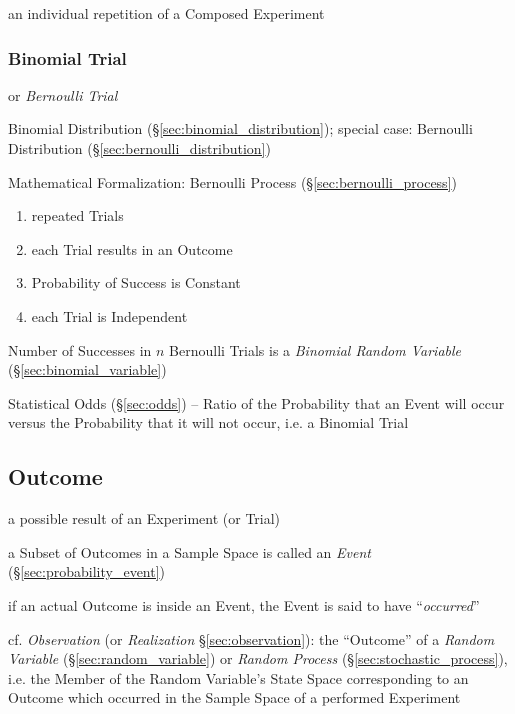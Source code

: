 an individual repetition of a Composed Experiment



\subsubsection{Binomial Trial}\label{sec:binomial_trial}

or \emph{Bernoulli Trial}

Binomial Distribution (\S\ref{sec:binomial_distribution}); special case:
Bernoulli Distribution (\S\ref{sec:bernoulli_distribution})

Mathematical Formalization: Bernoulli Process (\S\ref{sec:bernoulli_process})

\begin{enumerate}
  \item repeated Trials
  \item each Trial results in an Outcome
  \item Probability of Success is Constant
  \item each Trial is Independent
\end{enumerate}

Number of Successes in $n$ Bernoulli Trials is a \emph{Binomial Random
  Variable} (\S\ref{sec:binomial_variable})

\fist Statistical Odds (\S\ref{sec:odds}) -- Ratio of the Probability that an
Event will occur versus the Probability that it will not occur, i.e. a Binomial
Trial



\subsection{Outcome}\label{sec:outcome}

a possible result of an Experiment (or Trial)

a Subset of Outcomes in a Sample Space is called an \emph{Event}
(\S\ref{sec:probability_event})

if an actual Outcome is inside an Event, the Event is said to have
``\emph{occurred}''

\fist cf. \emph{Observation} (or \emph{Realization} \S\ref{sec:observation}):
the ``Outcome'' of a \emph{Random Variable} (\S\ref{sec:random_variable}) or
\emph{Random Process} (\S\ref{sec:stochastic_process}), i.e. the Member of the
Random Variable's State Space corresponding to an Outcome which occurred in the
Sample Space of a performed Experiment

